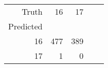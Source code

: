 \begin{tabular}{rrrrr}
\toprule
Truth & 16 & 17 \\
Predicted &  &  \\
\midrule
16 & 477 & 389 \\
17 & 1 & 0 \\
\bottomrule
\end{tabular}
